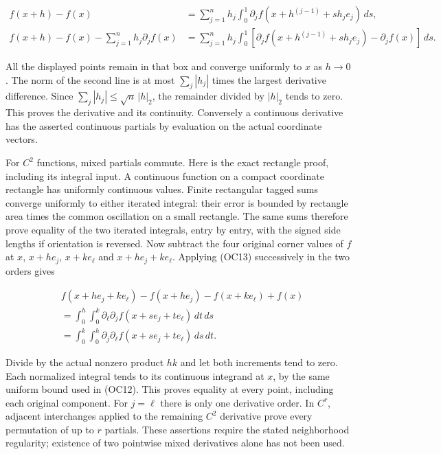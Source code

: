 \documentclass[
  11pt,
]{article}
\begin{document}
\[
 \begin{aligned}
 f(x+h)-f(x)
 &=\sum_{j=1}^n h_j\int_0^1
       \partial_jf(x+h^{(j-1)}+s h_j e_j)\,ds,\\
 f(x+h)-f(x)-\sum_{j=1}^n h_j\partial_jf(x)
 &=\sum_{j=1}^n h_j\int_0^1
   [\partial_jf(x+h^{(j-1)}+s h_j e_j)-\partial_jf(x)]\,ds.
 \end{aligned}\tag{OC19}
\]

All the displayed points remain in that box and converge uniformly to
\(x\) as \(h\to0\). The norm of the second line is at most
\(\sum_j|h_j|\) times the largest derivative difference. Since
\(\sum_j|h_j|\le\sqrt n\,|h|_2\), the remainder divided by \(|h|_2\)
tends to zero. This proves the derivative and its continuity. Conversely
a continuous derivative has the asserted continuous partials by
evaluation on the actual coordinate vectors.

For \(C^2\) functions, mixed partials commute. Here is the exact
rectangle proof, including its integral input. A continuous function on
a compact coordinate rectangle has uniformly continuous values. Finite
rectangular tagged sums converge uniformly to either iterated integral:
their error is bounded by rectangle area times the common oscillation on
a small rectangle. The same sums therefore prove equality of the two
iterated integrals, entry by entry, with the signed side lengths if
orientation is reversed. Now subtract the four original corner values of
\(f\) at \(x\), \(x+h e_j\), \(x+k e_\ell\) and \(x+h e_j+k e_\ell\).
Applying (OC13) successively in the two orders gives

\[
 \begin{aligned}
 &f(x+h e_j+k e_\ell)-f(x+h e_j)-f(x+k e_\ell)+f(x)\\
 &=\int_0^h\int_0^k
    \partial_\ell\partial_jf(x+s e_j+t e_\ell)\,dt\,ds\\
 &=\int_0^k\int_0^h
    \partial_j\partial_\ell f(x+s e_j+t e_\ell)\,ds\,dt.
 \end{aligned}\tag{OC20}
\]

Divide by the actual nonzero product \(hk\) and let both increments tend
to zero. Each normalized integral tends to its continuous integrand at
\(x\), by the same uniform bound used in (OC12). This proves equality at
every point, including each original component. For \(j=\ell\) there is
only one derivative order. In \(C^r\), adjacent interchanges applied to
the remaining \(C^2\) derivative prove every permutation of up to \(r\)
partials. These assertions require the stated neighborhood regularity;
existence of two pointwise mixed derivatives alone has not been used.
\end{document}
